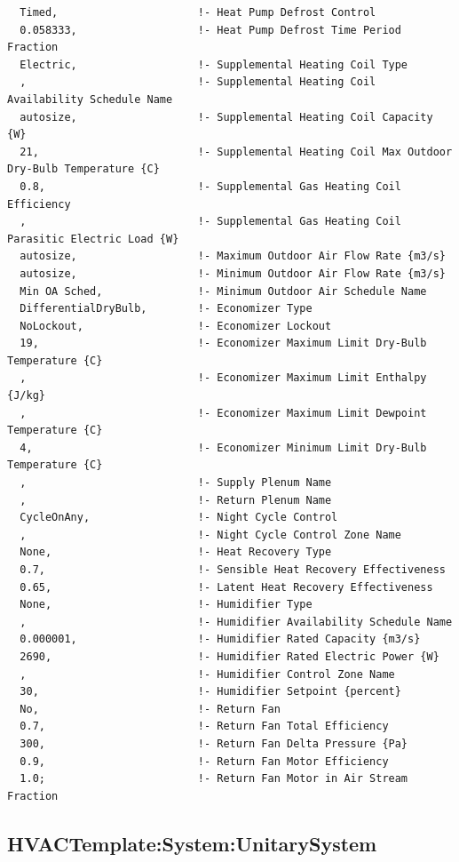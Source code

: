 \begin{lstlisting}
  Timed,                      !- Heat Pump Defrost Control
  0.058333,                   !- Heat Pump Defrost Time Period Fraction
  Electric,                   !- Supplemental Heating Coil Type
  ,                           !- Supplemental Heating Coil Availability Schedule Name
  autosize,                   !- Supplemental Heating Coil Capacity {W}
  21,                         !- Supplemental Heating Coil Max Outdoor Dry-Bulb Temperature {C}
  0.8,                        !- Supplemental Gas Heating Coil Efficiency
  ,                           !- Supplemental Gas Heating Coil Parasitic Electric Load {W}
  autosize,                   !- Maximum Outdoor Air Flow Rate {m3/s}
  autosize,                   !- Minimum Outdoor Air Flow Rate {m3/s}
  Min OA Sched,               !- Minimum Outdoor Air Schedule Name
  DifferentialDryBulb,        !- Economizer Type
  NoLockout,                  !- Economizer Lockout
  19,                         !- Economizer Maximum Limit Dry-Bulb Temperature {C}
  ,                           !- Economizer Maximum Limit Enthalpy {J/kg}
  ,                           !- Economizer Maximum Limit Dewpoint Temperature {C}
  4,                          !- Economizer Minimum Limit Dry-Bulb Temperature {C}
  ,                           !- Supply Plenum Name
  ,                           !- Return Plenum Name
  CycleOnAny,                 !- Night Cycle Control
  ,                           !- Night Cycle Control Zone Name
  None,                       !- Heat Recovery Type
  0.7,                        !- Sensible Heat Recovery Effectiveness
  0.65,                       !- Latent Heat Recovery Effectiveness
  None,                       !- Humidifier Type
  ,                           !- Humidifier Availability Schedule Name
  0.000001,                   !- Humidifier Rated Capacity {m3/s}
  2690,                       !- Humidifier Rated Electric Power {W}
  ,                           !- Humidifier Control Zone Name
  30,                         !- Humidifier Setpoint {percent}
  No,                         !- Return Fan
  0.7,                        !- Return Fan Total Efficiency
  300,                        !- Return Fan Delta Pressure {Pa}
  0.9,                        !- Return Fan Motor Efficiency
  1.0;                        !- Return Fan Motor in Air Stream Fraction
\end{lstlisting}

\subsection{HVACTemplate:System:UnitarySystem}\label{hvactemplatesystemunitarysystem}

